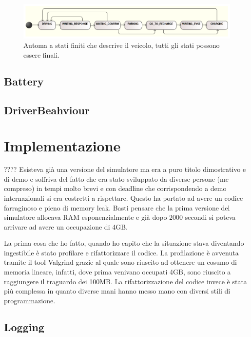 \begin{figure}
	\centering
	\includegraphics[width=1.0\textwidth]{assets/car-fsmd.png}
	\caption{Automa a stati finiti che descrive il veicolo, tutti gli stati possono essere finali.}
	\label{fig:car-fsmd}
\end{figure}

\subsection{Battery}\label{sec:battery}

\subsection{DriverBeahviour}

\section{Implementazione}

????
Esisteva già una versione del simulatore ma era a puro titolo dimostrativo e di demo e soffriva del fatto che era stato sviluppato da diverse persone (me compreso) in tempi molto brevi e con deadline che corrispondendo a demo internazionali si era costretti a rispettare. Questo ha portato ad avere un codice farraginoso e pieno di memory leak. Basti pensare che la prima versione del simulatore allocava RAM esponenzialmente e già dopo 2000 secondi si poteva arrivare ad avere un occupazione di 4GB.

La prima cosa che ho fatto, quando ho capito che la situazione stava diventando ingestibile è stato profilare e rifattorizzare il codice. La profilazione è avvenuta tramite il tool Valgrind grazie al quale sono riuscito ad ottenere un cosumo di memoria lineare, infatti, dove prima venivano occupati 4GB, sono riuscito a raggiungere il traguardo dei 100MB. La rifattorizzazione del codice invece è stata più complessa in quanto diverse mani hanno messo mano con diversi stili di programmazione. 

\subsection{Logging}

